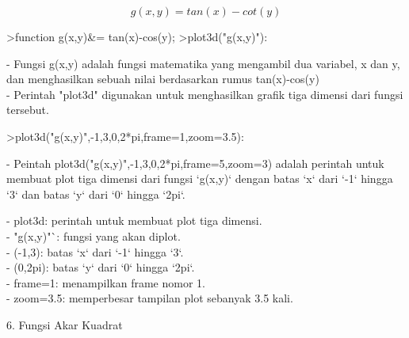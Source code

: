 \documentclass[a4paper,10pt]{article}
\begin{document}
\begin{eulernotebook}
\begin{eulercomment}
\begin{eulercomment}
\begin{eulercomment}
\begin{eulercomment}
\begin{eulercomment}
\begin{eulercomment}
\begin{eulercomment}
\begin{eulercomment}
\begin{eulercomment}
\end{eulercomment}
\begin{eulerformula}
\[
g(x,y)=tan(x) - cot(y)
\]
\end{eulerformula}
\begin{eulerprompt}
>function g(x,y)&= tan(x)-cos(y);
>plot3d("g(x,y)"):
\end{eulerprompt}
\begin{eulercomment}
- Fungsi g(x,y) adalah fungsi matematika yang mengambil dua variabel,
x dan y, dan menghasilkan sebuah nilai berdasarkan rumus tan(x)-cos(y)\\
- Perintah "plot3d" digunakan untuk menghasilkan grafik tiga dimensi
dari fungsi tersebut.
\end{eulercomment}
\begin{eulerprompt}
>plot3d("g(x,y)",-1,3,0,2*pi,frame=1,zoom=3.5):
\end{eulerprompt}
\begin{eulercomment}
- Peintah plot3d("g(x,y)",-1,3,0,2*pi,frame=5,zoom=3) adalah perintah
untuk membuat plot tiga dimensi dari fungsi `g(x,y)` dengan batas `x`
dari `-1` hingga `3` dan batas `y` dari `0` hingga `2pi`.

- plot3d: perintah untuk membuat plot tiga dimensi.\\
- "g(x,y)"`: fungsi yang akan diplot.\\
- (-1,3): batas `x` dari `-1` hingga `3`.\\
- (0,2pi): batas `y` dari `0` hingga `2pi`.\\
- frame=1: menampilkan frame nomor 1.\\
- zoom=3.5: memperbesar tampilan plot sebanyak 3.5 kali.

\end{eulercomment}
\eulersubheading{}
\begin{eulercomment}
6. Fungsi Akar Kuadrat


\end{eulercomment}
\end{eulercomment}
\end{eulercomment}
\end{eulercomment}
\end{eulercomment}
\end{eulercomment}
\end{eulercomment}
\end{eulercomment}
\end{eulercomment}
\end{eulernotebook}
\end{document}
